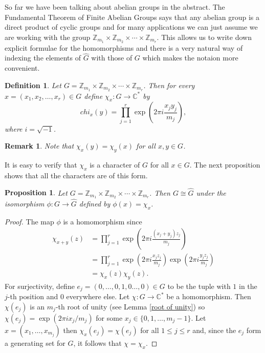 \documentclass[12pt]{article}
\newtheorem{Definition}{Definition}
\newtheorem{Proposition}{Proposition}
\newtheorem{Remark}{Remark}
\newcommand{\Z}{\mathbb{Z}}
\newcommand{\C}{\mathbb{C}}
\newcommand{\Zm}{\Z_{m_1}\times \Z_{m_2} \times \cdots \times \Z_{m_r}}
\begin{document}
So far we have been talking about abelian groups in the abstract.
The Fundamental Theorem of Finite Abelian Groups says that any abelian group is a direct product of cyclic groups and for many applications we can just assume we are working with the group $\Zm$.
This allows us to write down explicit formulae for the homomorphisms and there is a very natural way of indexing the elements of $\widehat{G}$ with those of $G$ which makes the notaion more convenient.

\begin{Definition} \label{characters}%
    Let $G = \Zm$.
    Then for every $x = (x_1, x_2, \dots , x_r)\in G$ define $\chi_x : G\to \C^*$ by
    \[
        chi_x(y) = \prod_{j = 1}^r\exp \left( 2 \pi i \frac{x_jy_j}{m_j}\right),
    \]
    where $i=\sqrt{-1}$.
\end{Definition}

\begin{Remark} \label{chiy(x)=chix(y)}
    Note that $\chi_x(y) = \chi_y(x)$ for all $x,y\in G$.
\end{Remark}

It is easy to verify that $\chi_x$ is a character of $G$ for all $x\in G$. The next proposition shows that all the characters are of this form.



\begin{Proposition} \label{G is isomorphic to dual}%
    Let $G=\Zm$.
    Then $G\cong \widehat{G}$ under the isomorphism $\phi : G \to \widehat{G}$   defined by $\phi(x) = \chi_x$.
\end{Proposition}
\begin{proof}
    The map $\phi$ is a homomorphism since
    \begin{align*}
        \chi_{x+y}(z)
          & = \prod_{j = 1}^r\exp \left( 2 \pi i \frac{(x_j + y_j)z_j}{m_j}\right)                                       \\
          & = \prod_{j = 1}^r\exp \left( 2 \pi i \frac{x_j z_j}{m_j}\right)\exp \left( 2 \pi i \frac{y_jz_j}{m_j}\right) \\
          & = \chi_x(z)\chi_y(z).
    \end{align*}
    For surjectivity, define $e_j = (0,\dots , 0,1,0\dots , 0)\in G$ to be the tuple with $1$ in the $j$-th position and $0$ everywhere else.
    Let $\chi:G\to \C^*$ be a homomorphism.
    Then $\chi(e_j)$ is an $m_j$-th root of unity (see Lemma \ref{root of unity}) so $\chi(e_j) = \exp(2 \pi i x_j/m_j)$ for some $x_j\in \{0,1,\dots , m_j-1\}$.
    Let $x=(x_1, \dots , x_{m_j})$ then $\chi_x(e_j) = \chi(e_j)$ for all $1\leq j \leq r$ and, since the $e_j$ form a generating set for $G$, it follows that $\chi=\chi_x$.
\end{proof}
\end{document}

